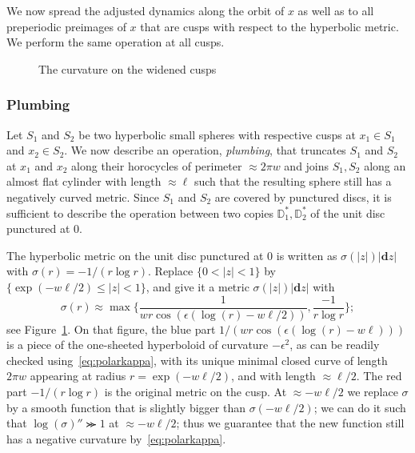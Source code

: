 \documentclass{amsart}
\newcommand\dd{\mathbf{d}}
\begin{document}
We now spread the adjusted dynamics along the orbit of $x$ as well as
to all preperiodic preimages of $x$ that are cusps with respect to
the hyperbolic metric. We perform the same operation at all cusps.

\begin{figure}
  \centering{}
  \caption{The curvature on the widened cusps}\label{fig:sigma}
\end{figure}

\subsubsection{Plumbing}\label{sss:Plumbing}
Let $S_1$ and $S_2$ be two hyperbolic small spheres with respective
cusps at $x_1\in S_1$ and $x_2\in S_2$. We now describe an operation,
\emph{plumbing}, that truncates $S_1$ and $S_2$ at $x_1$ and $x_2$
along their horocycles of perimeter $\approx 2\pi w$ and joins
$S_1,S_2$ along an almost flat cylinder with length $\approx \ell$
such that the resulting sphere still has a negatively curved
metric. Since $S_1$ and $S_2$ are covered by punctured discs, it is
sufficient to describe the operation between two copies
$\mathbb D^*_1, \mathbb D^*_2$ of the unit disc punctured at $0$. 

The hyperbolic metric on the unit disc punctured at $0$ is written as
$\sigma(|z|)|\dd z|$ with $\sigma(r)=-1/(r\log r)$. Replace $\{0<|z|<1\}$
by $\{\exp(-w\ell/2)\le|z|<1\}$, and give it a metric
$\sigma(|z|)|\dd z|$ with
\[\sigma(r)\approx\max\Big\{\frac1{w r\cos(\epsilon(\log(r)-w\ell/2))},\frac{-1}{r\log r}\Big\};
\]
see Figure~\ref{fig:sigma}. On that figure, the blue part
$1/(w r\cos(\epsilon(\log(r)-w\ell)))$ is a piece of the one-sheeted
hyperboloid of curvature $-\epsilon^2$, as can be readily checked
using~\eqref{eq:polarkappa}, with its unique minimal closed curve of
length $2\pi w$ appearing at radius $r=\exp(-w\ell/2)$, and with
length $\approx\ell/2$. The red part $-1/(r\log r)$ is the original
metric on the cusp. At $\approx-w\ell/2$ we replace $\sigma$ by a
smooth function that is slightly bigger than $\sigma (-w\ell/2)$; we
can do it such that $\log(\sigma)''\ggcurly 1$ at $\approx -w\ell/2$;
thus we guarantee that the new function still has a negative curvature
by~\eqref{eq:polarkappa}.
\end{document}
